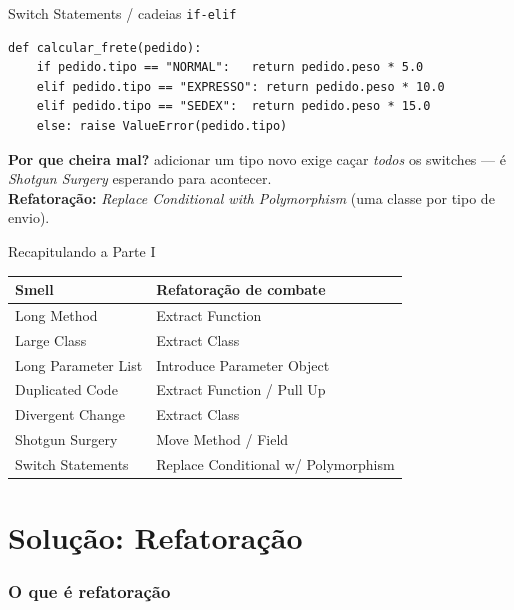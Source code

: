 \documentclass[aspectratio=169]{beamer}
\begin{document}
\begin{frame}[fragile]{Switch Statements / cadeias \texttt{if-elif}}
\begin{lstlisting}
def calcular_frete(pedido):
    if pedido.tipo == "NORMAL":   return pedido.peso * 5.0
    elif pedido.tipo == "EXPRESSO": return pedido.peso * 10.0
    elif pedido.tipo == "SEDEX":  return pedido.peso * 15.0
    else: raise ValueError(pedido.tipo)
\end{lstlisting}
  \footnotesize
  \textbf{Por que cheira mal?} adicionar um tipo novo exige caçar
  \emph{todos} os switches --- é \emph{Shotgun Surgery} esperando para
  acontecer.\\
  \textbf{Refatoração:} \emph{Replace Conditional with Polymorphism}
  (uma classe por tipo de envio).
\end{frame}

\begin{frame}{Recapitulando a Parte I}
  \begin{center}
  \begin{tabular}{ll}
    \toprule
    \textbf{Smell} & \textbf{Refatoração de combate} \\
    \midrule
    Long Method            & Extract Function \\
    Large Class            & Extract Class \\
    Long Parameter List    & Introduce Parameter Object \\
    Duplicated Code        & Extract Function / Pull Up \\
    Divergent Change       & Extract Class \\
    Shotgun Surgery        & Move Method / Field \\
    Switch Statements      & Replace Conditional w/ Polymorphism \\
    \bottomrule
  \end{tabular}
  \end{center}
\end{frame}

\part{Solução: Refatoração}
\section{O que é refatoração}
\end{document}
